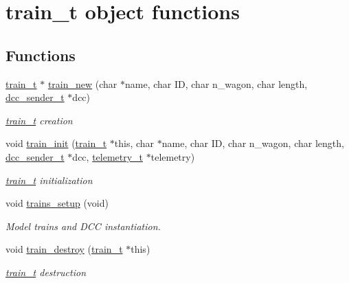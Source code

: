\hypertarget{group__train__t__object}{\section{train\-\_\-t object functions}
\label{group__train__t__object}
}
\subsection*{Functions}
\begin{DoxyCompactItemize}
\item 
\hyperlink{structtrain__t}{train\-\_\-t} $\ast$ \hyperlink{group__train__t__object_ga70e77691cff7bdc84a461f7fab1c3916}{train\-\_\-new} (char $\ast$name, char I\-D, char n\-\_\-wagon, char length, \hyperlink{structdcc__sender__t}{dcc\-\_\-sender\-\_\-t} $\ast$dcc)
\begin{DoxyCompactList}\small\item\em \hyperlink{structtrain__t}{train\-\_\-t} creation \end{DoxyCompactList}\item 
void \hyperlink{group__train__t__object_ga4cfab4202f81ad2996cf09acc5911974}{train\-\_\-init} (\hyperlink{structtrain__t}{train\-\_\-t} $\ast$this, char $\ast$name, char I\-D, char n\-\_\-wagon, char length, \hyperlink{structdcc__sender__t}{dcc\-\_\-sender\-\_\-t} $\ast$dcc, \hyperlink{structtelemetry__t}{telemetry\-\_\-t} $\ast$telemetry)
\begin{DoxyCompactList}\small\item\em \hyperlink{structtrain__t}{train\-\_\-t} initialization \end{DoxyCompactList}\item 
void \hyperlink{group__train__t__object_gaabbf02bfbe6892af7ee3a86cd4cfe023}{trains\-\_\-setup} (void)
\begin{DoxyCompactList}\small\item\em Model trains and D\-C\-C instantiation. \end{DoxyCompactList}\item 
void \hyperlink{group__train__t__object_gaf6a5b2bd35fdbc74a139af997e58bcf8}{train\-\_\-destroy} (\hyperlink{structtrain__t}{train\-\_\-t} $\ast$this)
\begin{DoxyCompactList}\small\item\em \hyperlink{structtrain__t}{train\-\_\-t} destruction \end{DoxyCompactList}\end{DoxyCompactItemize}


